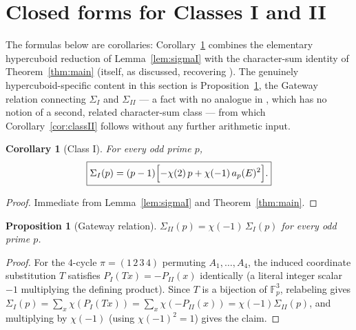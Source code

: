 \documentclass[11pt]{amsart}
\newtheorem{proposition}[theorem]{Proposition}
\newtheorem{corollary}[theorem]{Corollary}
\theoremstyle{definition}
\newcommand{\Fp}{\mathbb{F}_p}
\begin{document}
\section{Closed forms for Classes I and II}
\label{sec:corollaries}

The formulas below are corollaries: Corollary~\ref{cor:classI} combines the elementary hypercuboid reduction of Lemma~\ref{lem:sigmaI} with the character-sum identity of Theorem~\ref{thm:main} (itself, as discussed, recovering \cite{AOP2002}). The genuinely hypercuboid-specific content in this section is Proposition~\ref{prop:gateway}, the Gateway relation connecting $\Sigma_I$ and $\Sigma_{II}$ — a fact with no analogue in \cite{AOP2002}, which has no notion of a second, related character-sum class — from which Corollary~\ref{cor:classII} follows without any further arithmetic input.

\begin{corollary}[Class I]
\label{cor:classI}
For every odd prime $p$,
\[
\boxed{\Sigma_I(p)=(p-1)\Bigl[-\chi(2)\,p+\chi(-1)\,a_p(E)^2\Bigr].}
\]
\end{corollary}

\begin{proof}
Immediate from Lemma~\ref{lem:sigmaI} and Theorem~\ref{thm:main}.
\end{proof}

\begin{proposition}[Gateway relation]
\label{prop:gateway}
$\Sigma_{II}(p)=\chi(-1)\,\Sigma_I(p)$ for every odd prime $p$.
\end{proposition}

\begin{proof}
For the $4$-cycle $\pi=(1\,2\,3\,4)$ permuting $A_1,\dots,A_4$, the induced coordinate substitution $T$ satisfies $P_I(Tx)=-P_{II}(x)$ identically (a literal integer scalar $-1$ multiplying the defining product). Since $T$ is a bijection of $\Fp^3$, relabeling gives $\Sigma_I(p)=\sum_x\chi(P_I(Tx))=\sum_x\chi(-P_{II}(x))=\chi(-1)\Sigma_{II}(p)$, and multiplying by $\chi(-1)$ (using $\chi(-1)^2=1$) gives the claim.
\end{proof}
\end{document}
